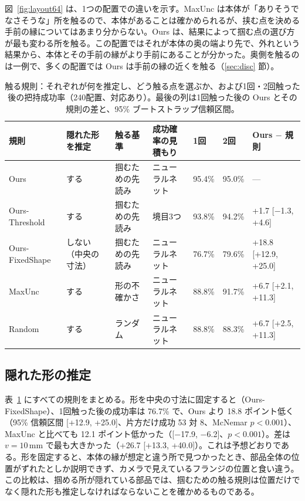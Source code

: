 \documentclass[conference]{IEEEtran}
\newcommand{\Ours}{Ours}
\newcommand{\Unc}{MaxUnc}
\newcommand{\Rand}{Random}
\newcommand{\Geom}{Ours-Threshold}
\newcommand{\Fix}{Ours-FixedShape}
\begin{document}
図~\ref{fig:layout64} は、1つの配置での違いを示す。\Unc{} は本体が「ありそうでなさそうな」所を触るので、本体があることは確かめられるが、挟む点を決める手前の縁についてはあまり分からない。\Ours{} は、結果によって掴む点の選び方が最も変わる所を触る。この配置ではそれが本体の奥の端より先で、外れという結果から、本体とその手前の縁がより手前にあることが分かった。奥側を触るのは一例で、多くの配置では \Ours{} は手前の縁の近くを触る（\ref{sec:disc} 節）。

\begin{table}[t]
\caption{触る規則：それぞれが何を推定し、どう触る点を選ぶか、および1回・2回触った後の把持成功率（240配置、対応あり）。最後の列は1回触った後の \Ours{} とその規則の差と、95\% ブートストラップ信頼区間。}
\label{tab:rules}
\centering
\small
\begin{tabular}{@{}lllllll@{}}
\toprule
規則 & 隠れた形を推定 & 触る基準 & 成功確率の見積もり & 1回 & 2回 & \Ours{} $-$ 規則 \\
\midrule
\Ours & する & 掴むための先読み & ニューラルネット & 95.4\% & 95.0\% & --- \\
\Geom & する & 掴むための先読み & 境目3つ & 93.8\% & 94.2\% & +1.7 [$-$1.3, +4.6] \\
\Fix & しない（中央の寸法） & 掴むための先読み & ニューラルネット & 76.7\% & 79.6\% & +18.8 [+12.9, +25.0] \\
\Unc & する & 形の不確かさ & ニューラルネット & 88.8\% & 91.7\% & +6.7 [+2.1, +11.3] \\
\Rand & する & ランダム & ニューラルネット & 88.8\% & 88.3\% & +6.7 [+2.5, +11.3] \\
\bottomrule
\end{tabular}
\end{table}

\subsection{隠れた形の推定}\label{sec:fix}
表~\ref{tab:rules} にすべての規則をまとめる。形を中央の寸法に固定すると（\Fix）、1回触った後の成功率は 76.7\% で、\Ours{} より 18.8 ポイント低く（95\% 信頼区間 [+12.9, +25.0]、片方だけ成功 53 対 8、McNemar $p<0.001$）、\Unc{} と比べても 12.1 ポイント低かった（[$-$17.9, $-$6.2]、$p<0.001$）。差は $v=10$\,mm で最も大きかった（+26.7 [+13.3, +40.0]）。これは予想どおりである。形を固定すると、本体の縁が想定と違う所で見つかったとき、部品全体の位置がずれたとしか説明できず、カメラで見えているフランジの位置と食い違う。この比較は、掴める所が隠れている部品では、掴むための触る規則は位置だけでなく隠れた形も推定しなければならないことを確かめるものである。
\end{document}
